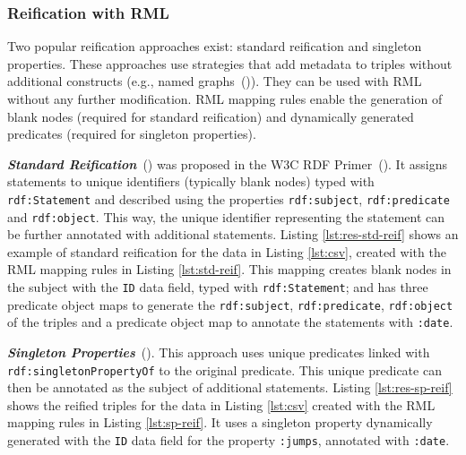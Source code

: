\subsubsection{Reification with RML}

Two popular reification approaches exist: standard reification and singleton properties. 
These approaches use strategies that add metadata to triples
without additional constructs (e.g., named graphs~(\cite{hernandez2015reifying})).
They can be used with RML without any further modification. RML mapping rules enable the generation of blank nodes (required for standard reification) and dynamically generated predicates (required for singleton properties). 

\noindent\textbf{\textit{Standard Reification}}~(\cite{manola2004rdf}) was proposed in the W3C RDF Primer~(\cite{manola2004rdf}).
It assigns statements to unique identifiers (typically blank nodes) typed with \texttt{rdf:Statement} and described using the properties \texttt{rdf:subject}, \texttt{rdf:predicate} and \texttt{rdf:object}.
This way, the unique identifier representing the statement can be further annotated with additional statements. Listing \ref{lst:res-std-reif} shows an example of standard reification for the data in Listing \ref{lst:csv}, created with the RML mapping rules in Listing \ref{lst:std-reif}. 
This mapping creates blank nodes in the subject with the \texttt{ID} data field, typed with \texttt{rdf:Statement}; and has three predicate object maps to generate the \texttt{rdf:subject}, \texttt{rdf:predicate}, \texttt{rdf:object} of the triples and a predicate object map to annotate the statements with \texttt{:date}.

\noindent\textbf{\textit{Singleton Properties}}~(\cite{nguyen2014don}). This approach uses unique predicates linked with \texttt{rdf:singletonPropertyOf} to the original predicate. 
This unique predicate can then be annotated as the subject of additional statements. 
Listing \ref{lst:res-sp-reif} shows the reified triples for the data in Listing \ref{lst:csv} created with the RML mapping rules in Listing \ref{lst:sp-reif}. 
It uses a singleton property dynamically generated with the \texttt{ID} data field for the property \texttt{:jumps}, annotated with \texttt{:date}.


